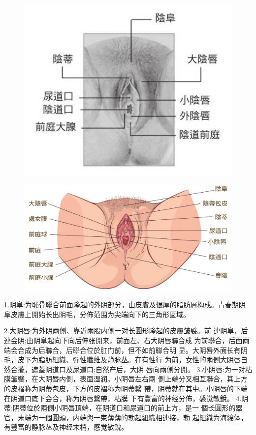 \documentclass[12pt,UTF8]{ctexbook}
\begin{document}
\begin{figure}[htbp]
	\centering
	\includegraphics[width=0.7\linewidth]{2}
	\caption{}
	\label{fig:1}
\end{figure}

\begin{figure}[htbp]
	\centering
	\includegraphics[width=0.7\linewidth]{7}
	\caption{}
	\label{fig:1}
\end{figure}

1.阴阜:为恥骨聯合前面隆起的外阴部分，由皮膚及很厚的脂肪層构成。青春期阴阜皮膚上開始长出阴毛，分佈范围为尖端向下的三角形區域。

2.大阴唇:为外阴兩側、靠近兩股内側一对长圓形隆起的皮膚皱襞。前
連阴阜，后連会阴;由阴阜起向下向后伸张開来，前面左、右大阴唇聯合成
为前聯合，后面兩端会合成为后聯合，后聯合位於肛门前，但不如前聯合明
显。大阴唇外面长有阴毛，皮下为脂肪組織、彈性纖维及静脉丛。在有性行
为前，女性的兩側大阴唇自然合攏，遮蓋阴道口及尿道口;自然产后，大阴
唇向兩側分開。
3.小阴唇:为一对粘膜皱襞，在大阴唇内側，表面湿润。小阴唇左右兩
側上端分叉相互聯合，其上方的皮褶称为阴蒂包皮，下方的皮褶称为阴蒂繫
帶，阴蒂就在其中。小阴唇的下端在阴道口底下会合，称为阴唇繫帶，粘膜
下有豐富的神经分佈，感觉敏銳。
4.阴蒂:阴蒂位於兩側小阴唇頂端，在阴道口和尿道口的前上方，是一
個长圓形的器官，末端为一個圓頭，内端與一束薄薄的勃起組織相連接，勃
起組織为海綿体，有豐富的静脉丛及神经末梢，感觉敏銳。
\end{document}
